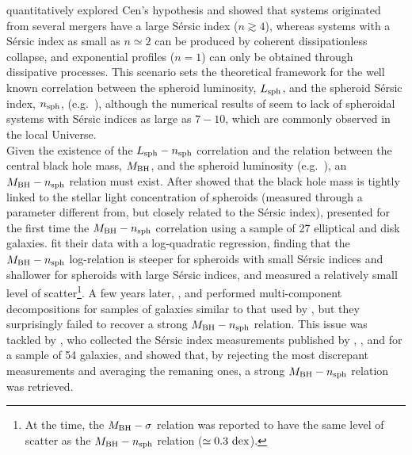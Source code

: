 \documentclass[preprint2]{emulateapj}
\begin{document}
\cite{nipoti2015} quantitatively explored Cen's hypothesis and showed that 
systems originated from several mergers have a large S\'ersic index ($n \gtrsim 4$), 
whereas systems with a S\'ersic index as small as $n \simeq 2$ can be produced by coherent dissipationless collapse, 
and exponential profiles ($n=1$) can only be obtained through dissipative processes.
This scenario sets the theoretical framework for the well known correlation between the spheroid luminosity, $L_{\rm sph}$,  
and the spheroid S\'ersic index, $n_{\rm sph}$, (e.g.~\citealt{youngcurrie1994,jerjen2000,grahamguzman2003}), 
although the numerical results of \cite{nipoti2015} seem to lack of spheroidal systems with S\'ersic indices as large as $7 - 10$, 
which are commonly observed in the local Universe.  \\
Given the existence of the $L_{\rm sph} - n_{\rm sph}$ correlation 
and the relation between the central black hole mass, $M_{\rm BH}$, and the spheroid luminosity (e.g.~\citealt{magorrian1998}), 
an $M_{\rm BH} - n_{\rm sph}$ relation must exist. 
After \cite{graham2001} showed that the black hole mass is tightly linked to the stellar light concentration of spheroids 
(measured through a parameter different from, but closely related to the S\'ersic index), 
\cite{grahamdriver2007} presented for the first time the $M_{\rm BH} - n_{\rm sph}$ correlation 
using a sample of 27 elliptical and disk galaxies. 
\cite{grahamdriver2007} fit their data with a log-quadratic regression, 
finding that the $M_{\rm BH} - n_{\rm sph}$ log-relation is steeper for spheroids with small S\'ersic indices 
and shallower for spheroids with large S\'ersic indices, 
and measured a relatively small level of scatter\footnote{At the time, the $M_{\rm BH} - \sigma$ relation 
\citep{ferraresemerritt2000,gebhardt2000} was reported to have the same level of scatter as the $M_{\rm BH} - n_{\rm sph}$ 
relation ($\simeq 0.3~\rm dex$). }.
A few years later, \cite{sani2011}, \cite{vika2012} and \cite{beifiori2012} performed multi-component decompositions 
for samples of galaxies similar to that used by \cite{grahamdriver2007}, 
but they surprisingly failed to recover a strong $M_{\rm BH} - n_{\rm sph}$ relation. 
This issue was tackled by \cite{savorgnan2013}, who collected the S\'ersic index measurements published by 
\cite{grahamdriver2007}, \cite{sani2011}, \cite{vika2012} and \cite{beifiori2012} for a sample of 54 galaxies, 
and showed that, by rejecting the most discrepant measurements and averaging the remaning ones, 
a strong $M_{\rm BH} - n_{\rm sph}$ relation was retrieved. 
\end{document}
